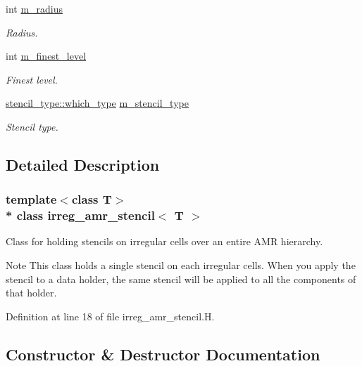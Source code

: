 \begin{DoxyCompactItemize}
int \hyperlink{classirreg__amr__stencil_abaf4503961d3b768341eaec30b551236}{m\+\_\+radius}
\begin{DoxyCompactList}\small\item\em Radius. \end{DoxyCompactList}\item 
int \hyperlink{classirreg__amr__stencil_a2fb8254dfa18387b72f3ec657e29e6c8}{m\+\_\+finest\+\_\+level}
\begin{DoxyCompactList}\small\item\em Finest level. \end{DoxyCompactList}\item 
\hyperlink{namespacestencil__type_a1ffed19935b7289b50e8dcc017ee99c8}{stencil\+\_\+type\+::which\+\_\+type} \hyperlink{classirreg__amr__stencil_a3391d92c08649f84308dccbc4c3d66f8}{m\+\_\+stencil\+\_\+type}
\begin{DoxyCompactList}\small\item\em Stencil type. \end{DoxyCompactList}\end{DoxyCompactItemize}


\subsection{Detailed Description}
\subsubsection*{template$<$class T$>$\\*
class irreg\+\_\+amr\+\_\+stencil$<$ T $>$}

Class for holding stencils on irregular cells over an entire A\+MR hierarchy. 

\begin{DoxyNote}{Note}
This class holds a single stencil on each irregular cells. When you apply the stencil to a data holder, the same stencil will be applied to all the components of that holder. 
\end{DoxyNote}


Definition at line 18 of file irreg\+\_\+amr\+\_\+stencil.\+H.



\subsection{Constructor \& Destructor Documentation}
